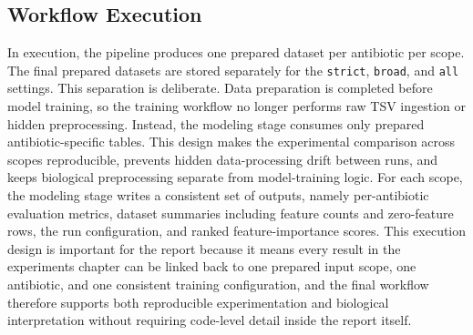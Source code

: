 \subsection{Workflow Execution}

In execution, the pipeline produces one prepared dataset per antibiotic per scope. The final prepared datasets are stored separately for the \texttt{strict}, \texttt{broad}, and \texttt{all} settings. This separation is deliberate. Data preparation is completed before model training, so the training workflow no longer performs raw TSV ingestion or hidden preprocessing. Instead, the modeling stage consumes only prepared antibiotic-specific tables. This design makes the experimental comparison across scopes reproducible, prevents hidden data-processing drift between runs, and keeps biological preprocessing separate from model-training logic. For each scope, the modeling stage writes a consistent set of outputs, namely per-antibiotic evaluation metrics, dataset summaries including feature counts and zero-feature rows, the run configuration, and ranked feature-importance scores. This execution design is important for the report because it means every result in the experiments chapter can be linked back to one prepared input scope, one antibiotic, and one consistent training configuration, and the final workflow therefore supports both reproducible experimentation and biological interpretation without requiring code-level detail inside the report itself.
